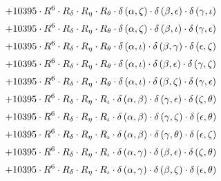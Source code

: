 \begin{subequations}
\begin{gather}
 \\[0.2em] \notag 		 + 10395 \cdot R^{6} \cdot R_{\delta{}} \cdot R_{\eta{}} \cdot R_{\theta{}} \cdot \delta{}\left(\alpha{}, \zeta{}\right) \cdot \delta{}\left(\beta{}, \epsilon{}\right) \cdot \delta{}\left(\gamma{}, \iota{}\right) 
 \\[0.2em] \notag 		 + 10395 \cdot R^{6} \cdot R_{\delta{}} \cdot R_{\eta{}} \cdot R_{\theta{}} \cdot \delta{}\left(\alpha{}, \zeta{}\right) \cdot \delta{}\left(\beta{}, \iota{}\right) \cdot \delta{}\left(\gamma{}, \epsilon{}\right) 
 \\[0.2em] \notag 		 + 10395 \cdot R^{6} \cdot R_{\delta{}} \cdot R_{\eta{}} \cdot R_{\theta{}} \cdot \delta{}\left(\alpha{}, \iota{}\right) \cdot \delta{}\left(\beta{}, \gamma{}\right) \cdot \delta{}\left(\epsilon{}, \zeta{}\right) 
 \\[0.2em] \notag 		 + 10395 \cdot R^{6} \cdot R_{\delta{}} \cdot R_{\eta{}} \cdot R_{\theta{}} \cdot \delta{}\left(\alpha{}, \iota{}\right) \cdot \delta{}\left(\beta{}, \epsilon{}\right) \cdot \delta{}\left(\gamma{}, \zeta{}\right) 
 \\[0.2em] \notag 		 + 10395 \cdot R^{6} \cdot R_{\delta{}} \cdot R_{\eta{}} \cdot R_{\theta{}} \cdot \delta{}\left(\alpha{}, \iota{}\right) \cdot \delta{}\left(\beta{}, \zeta{}\right) \cdot \delta{}\left(\gamma{}, \epsilon{}\right) 
 \\[0.2em] \notag 		 + 10395 \cdot R^{6} \cdot R_{\delta{}} \cdot R_{\eta{}} \cdot R_{\iota{}} \cdot \delta{}\left(\alpha{}, \beta{}\right) \cdot \delta{}\left(\gamma{}, \epsilon{}\right) \cdot \delta{}\left(\zeta{}, \theta{}\right) 
 \\[0.2em] \notag 		 + 10395 \cdot R^{6} \cdot R_{\delta{}} \cdot R_{\eta{}} \cdot R_{\iota{}} \cdot \delta{}\left(\alpha{}, \beta{}\right) \cdot \delta{}\left(\gamma{}, \zeta{}\right) \cdot \delta{}\left(\epsilon{}, \theta{}\right) 
 \\[0.2em] \notag 		 + 10395 \cdot R^{6} \cdot R_{\delta{}} \cdot R_{\eta{}} \cdot R_{\iota{}} \cdot \delta{}\left(\alpha{}, \beta{}\right) \cdot \delta{}\left(\gamma{}, \theta{}\right) \cdot \delta{}\left(\epsilon{}, \zeta{}\right) 
 \\[0.2em] \notag 		 + 10395 \cdot R^{6} \cdot R_{\delta{}} \cdot R_{\eta{}} \cdot R_{\iota{}} \cdot \delta{}\left(\alpha{}, \gamma{}\right) \cdot \delta{}\left(\beta{}, \epsilon{}\right) \cdot \delta{}\left(\zeta{}, \theta{}\right) 
 \\[0.2em] \notag 		 + 10395 \cdot R^{6} \cdot R_{\delta{}} \cdot R_{\eta{}} \cdot R_{\iota{}} \cdot \delta{}\left(\alpha{}, \gamma{}\right) \cdot \delta{}\left(\beta{}, \zeta{}\right) \cdot \delta{}\left(\epsilon{}, \theta{}\right) 

\end{gather}
\end{subequations}
